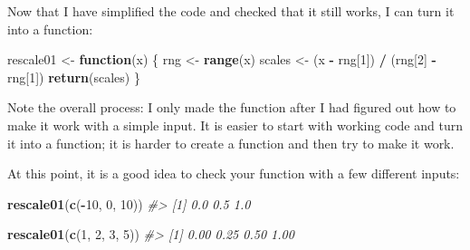 \documentclass[
]{book}
\newenvironment{Shaded}{\begin{snugshade}}{\end{snugshade}}
\newcommand{\CommentTok}[1]{\textcolor[rgb]{0.56,0.35,0.01}{\textit{#1}}}
\newcommand{\ControlFlowTok}[1]{\textcolor[rgb]{0.13,0.29,0.53}{\textbf{#1}}}
\newcommand{\DecValTok}[1]{\textcolor[rgb]{0.00,0.00,0.81}{#1}}
\newcommand{\KeywordTok}[1]{\textcolor[rgb]{0.13,0.29,0.53}{\textbf{#1}}}
\newcommand{\NormalTok}[1]{#1}
\newcommand{\OperatorTok}[1]{\textcolor[rgb]{0.81,0.36,0.00}{\textbf{#1}}}
\newcommand{\StringTok}[1]{\textcolor[rgb]{0.31,0.60,0.02}{#1}}
\begin{document}
\begin{Shaded}
\end{Shaded}

Now that I have simplified the code and checked that it still works, I can turn it into a function:

\begin{Shaded}
\begin{Highlighting}[]
\NormalTok{rescale01 <-}\StringTok{ }\ControlFlowTok{function}\NormalTok{(x) \{}
\NormalTok{  rng <-}\StringTok{ }\KeywordTok{range}\NormalTok{(x)}
\NormalTok{  scales <-}\StringTok{ }\NormalTok{(x }\OperatorTok{-}\StringTok{ }\NormalTok{rng[}\DecValTok{1}\NormalTok{]) }\OperatorTok{/}\StringTok{ }\NormalTok{(rng[}\DecValTok{2}\NormalTok{] }\OperatorTok{-}\StringTok{ }\NormalTok{rng[}\DecValTok{1}\NormalTok{])}
  \KeywordTok{return}\NormalTok{(scales)}
\NormalTok{\}}
\end{Highlighting}
\end{Shaded}

Note the overall process: I only made the function after I had figured out how to make it work with a simple input. It is easier to start with working code and turn it into a function; it is harder to create a function and then try to make it work.

At this point, it is a good idea to check your function with a few different inputs:

\begin{Shaded}
\begin{Highlighting}[]
\KeywordTok{rescale01}\NormalTok{(}\KeywordTok{c}\NormalTok{(}\OperatorTok{-}\DecValTok{10}\NormalTok{, }\DecValTok{0}\NormalTok{, }\DecValTok{10}\NormalTok{))}
\CommentTok{#> [1] 0.0 0.5 1.0}

\KeywordTok{rescale01}\NormalTok{(}\KeywordTok{c}\NormalTok{(}\DecValTok{1}\NormalTok{, }\DecValTok{2}\NormalTok{, }\DecValTok{3}\NormalTok{, }\DecValTok{5}\NormalTok{))}
\CommentTok{#> [1] 0.00 0.25 0.50 1.00}
\end{Highlighting}
\end{Shaded}
\end{document}
